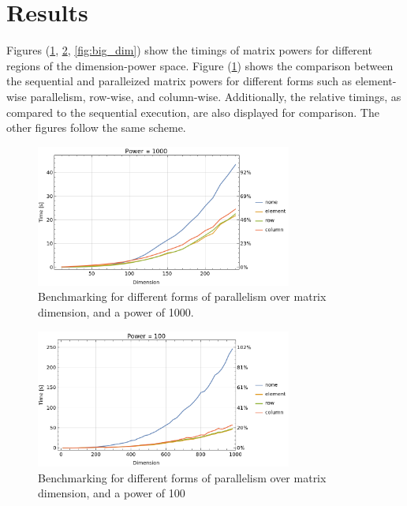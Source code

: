 \documentclass{article}
\begin{document}
\section{Results}

    Figures (\ref{fig:small_dim}, \ref{fig:med_dim}, \ref{fig:big_dim}) show the timings of matrix powers for different regions of the dimension-power space.  Figure (\ref{fig:small_dim}) shows the comparison between the sequential and paralleized matrix powers for different forms such as element-wise parallelism, row-wise, and column-wise.  Additionally, the relative timings, as compared to the sequential execution, are also displayed for comparison.  The other figures follow the same scheme.

    \begin{figure}[h]
        \centering
        \includegraphics[width=0.75\textwidth]{images/dimension_small.png}
        \caption{Benchmarking for different forms of parallelism over matrix dimension, and a power of 1000.}
        \label{fig:small_dim}
    \end{figure}

    \begin{figure}[h]
        \centering
        \includegraphics[width=0.75\textwidth]{images/dimension.png}
        \caption{Benchmarking for different forms of parallelism over matrix dimension, and a power of 100}
        \label{fig:med_dim}
    \end{figure}
\end{document}
